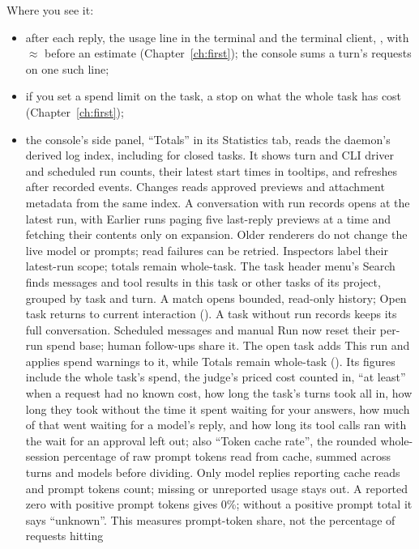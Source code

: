 Where you see it:

\begin{itemize}
  \item after each reply, the usage line in the terminal and the terminal
    client, , with
    $\approx$ before an estimate (Chapter~\ref{ch:first}); the console
    sums a turn's requests on one such line;
  \item if you set a spend limit on the task, a stop on what the whole
    task has cost (Chapter~\ref{ch:first});
  \item the console's side panel, ``Totals'' in its Statistics tab, reads the
    daemon's derived log index, including for closed tasks. It shows turn and
    CLI driver and scheduled run counts, their latest start times in tooltips, and refreshes
    after recorded events. Changes reads approved previews and attachment
    metadata from the same index. A conversation with run records
    opens at the latest run, with Earlier runs paging five last-reply previews
    at a time and fetching their contents only on expansion. Older renderers
    do not change the live model or prompts; read failures can be retried.
    Inspectors label their latest-run scope; totals remain whole-task. The task
    header menu's Search finds messages and tool results in this task or other tasks
    of its project, grouped by task and turn. A match opens bounded, read-only
    history; Open task returns to current interaction (). A task
    without run records keeps its full conversation. Scheduled messages and
    manual Run now reset their per-run spend base; human follow-ups share it.
    The open task adds This run and applies spend warnings to it, while
    Totals remain whole-task (). Its figures include the whole
    task's spend, the judge's priced cost counted in, ``at least'' when a
    request had no known cost, how long the task's turns took all in, how
    long they took without the time it spent waiting for your answers, how
    much of that went waiting for a model's reply, and how long its tool
    calls ran with the wait for an approval left out; also ``Token cache
    rate'', the rounded whole-session percentage of raw prompt tokens read
    from cache, summed across turns and models before dividing. Only model
    replies reporting cache reads and prompt tokens count; missing or
    unreported usage stays out. A reported zero with positive prompt tokens
    gives 0\%; without a positive prompt total it says ``unknown''. This
    measures prompt-token share, not the percentage of requests hitting

\end{itemize}
